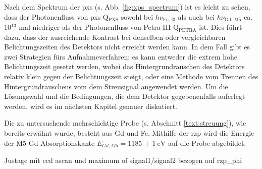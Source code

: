 \noindent
Nach dem Spektrum der \gls{pxs} (s. Abb. \ref{fig:xps_spectrum}) ist es leicht zu sehen, dass der Photonenfluss von \gls{pxs} Q$_{\text{PXS}}$ sowohl bei $h\nu_{\text{Fe, l3}}$ als auch bei $h\nu_{\text{Gd, M5}}$ ca. 10$^{13}$ mal niedriger als der Photonenfluss von Petra III Q$_\text{PETRA}$ ist. Dies führt dazu, dass der ausreichende Kontrast bei denselben oder vergleichbaren Belichtungszeiten des Detektors nicht erreicht werden kann. In dem Fall gibt es zwei Strategien fürs Aufnahmeverfahren: es kann entweder die extrem hohe Belichtungszeit gesetzt werden, wobei das Hintergrundrauschen des Detektors relativ klein gegen der Belichtungszeit steigt, oder eine Methode vom Trennen des Hintergrundrauschens vom dem Streusignal angewendet werden. Um die Lösungswahl und die Bedingungen, die dem Detektor gegebenenfalls auferlegt werden, wird es im nächsten Kapitel genauer diskutiert. 

\noindent
Die zu untersuchende mehrschichtige Probe (s. Abschnitt \ref{text:streuung}), wie bereits erwähnt wurde, besteht aus Gd und Fe. Mithilfe der \gls{rzp} wird die Energie der M5 Gd-Absorptionskante $E_{Gd, M5} = \SI{1185(1)}{\eV}$ \cite[Abb. 6(a)]{prieto_x-ray_2005} auf die Probe abgebildet.

Justage mit ccd ascan und maximum of signal1/signal2 bezogen auf rzp\_phi 


